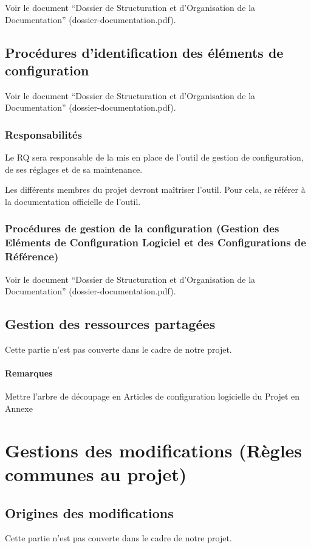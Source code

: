 \documentclass[a4paper]{article}
\begin{document}
Voir le document ``Dossier de Structuration et d'Organisation de la Documentation'' (dossier-documentation.pdf).

\subsection{Procédures d'identification des éléments de configuration }

Voir le document ``Dossier de Structuration et d'Organisation de la Documentation'' (dossier-documentation.pdf).

\subsubsection{Responsabilités}

Le RQ sera responsable de la mis en place de l'outil de gestion de configuration, de ses réglages et de sa maintenance.

Les différents membres du projet devront maîtriser l'outil. Pour cela, se référer à la documentation officielle de l'outil.

\subsubsection{Procédures de gestion de la configuration (Gestion des Eléments de Configuration Logiciel et des Configurations de Référence)}

Voir le document ``Dossier de Structuration et d'Organisation de la Documentation'' (dossier-documentation.pdf).

\subsection{Gestion des ressources partagées}
Cette partie n'est pas couverte dans le cadre de notre projet.

\paragraph{Remarques}

Mettre l'arbre de découpage en Articles de configuration logicielle du Projet en Annexe

\section{Gestions des modifications (Règles communes au projet)}

\subsection{Origines des modifications}
Cette partie n'est pas couverte dans le cadre de notre projet.
\end{document}

